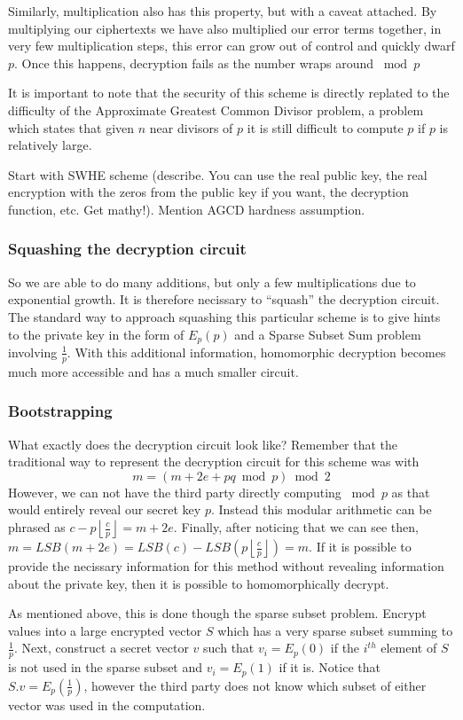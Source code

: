 \documentclass[letterpaper,twocolumn,10pt]{article}
\newcommand{\floor}[1]{\left\lfloor #1 \right\rfloor}
\begin{document}
Similarly, multiplication also has this property, but with a caveat attached. By multiplying our ciphertexts we have also multiplied our error terms together, in very few multiplication steps, this error can grow out of control and quickly dwarf $p$. Once this happens, decryption fails as the number wraps around $\bmod p$

It is important to note that the security of this scheme is directly replated to the difficulty of the Approximate Greatest Common Divisor problem, a problem which states that given $n$ near divisors of $p$ it is still difficult to compute $p$ if $p$ is relatively large.

Start with SWHE scheme (describe. You can use the real public key, the real encryption with the zeros from the public key if you want, the decryption function, etc. Get mathy!). Mention AGCD hardness assumption.

\subsubsection{Squashing the decryption circuit}
So we are able to do many additions, but only a few multiplications due to exponential growth. It is therefore necissary to ``squash'' the decryption circuit. The standard way to approach squashing this particular scheme is to give hints to the private key in the form of $E_p(p)$ and a Sparse Subset Sum problem involving $\frac{1}{p}$. With this additional information, homomorphic decryption becomes much more accessible and has a much smaller circuit.

\subsubsection{Bootstrapping}
What exactly does the decryption circuit look like? Remember that the traditional way to represent the decryption circuit for this scheme was with
$$m = (m + 2e + pq \bmod p) \bmod 2$$
However, we can not have the third party directly computing $\bmod p$ as that would entirely reveal our secret key $p$. Instead this modular arithmetic can be phrased as $c- p\floor{\frac{c}{p}} = m + 2e$. Finally, after noticing that we can see then, $m = LSB(m + 2e) = LSB(c) - LSB(p\floor{\frac{c}{p}}) = m$. If it is possible to provide the necissary information for this method without revealing information about the private key, then it is possible to homomorphically decrypt.

As mentioned above, this is done though the sparse subset problem. Encrypt values into a large encrypted vector $S$ which has a very sparse subset summing to $\frac{1}{p}$. Next, construct a secret vector $v$ such that $v_i = E_p(0)$ if the $i^{th}$ element of $S$ is not used in the sparse subset and $v_i = E_p(1)$ if it is. Notice that $S.v = E_p(\frac{1}{p})$, however the third party does not know which subset of either vector was used in the computation.
\end{document}
